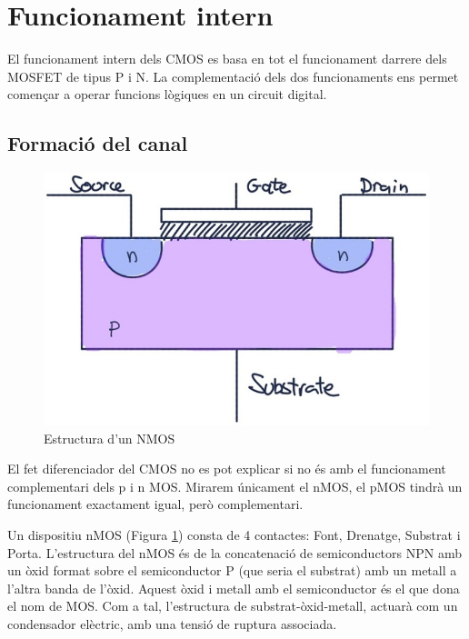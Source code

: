 \documentclass[11pt,a4paper]{article}
\begin{document}
\section{Funcionament intern}

El funcionament intern dels CMOS es basa en tot el funcionament darrere dels MOSFET de tipus P i N. La complementació dels dos funcionaments ens permet començar a operar funcions lògiques en un circuit digital.

\subsection{Formació del canal}

\begin{figure}
    \centering
    \includegraphics[width=\linewidth]{images/nmos1.jpg}
    \caption{Estructura d'un NMOS}
    \label{fig:nmos1}
    \vspace{-0.3cm}
\end{figure}
El fet diferenciador del CMOS no es pot explicar si no és amb el funcionament complementari dels p i n MOS. Mirarem únicament el nMOS, el pMOS tindrà un funcionament exactament igual, però complementari.


Un dispositiu nMOS (Figura \ref{fig:nmos1}) consta de 4 contactes: Font, Drenatge, Substrat i Porta. L'estructura del nMOS és de la concatenació de semiconductors NPN amb un òxid format sobre el semiconductor P (que seria el substrat) amb un metall a l'altra banda de l'òxid. Aquest òxid i metall amb el semiconductor és el que dona el nom de MOS. Com a tal, l'estructura de substrat-òxid-metall, actuarà com un condensador elèctric, amb una tensió de ruptura associada.
\end{document}
